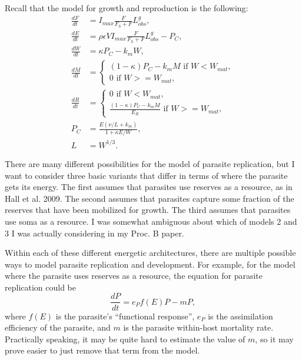 \documentclass[12pt,reqno,final,pdftex]{amsart}\usepackage[]{graphicx}\usepackage[]{color}
\theoremstyle{plain}
\numberwithin{equation}{part}
\begin{document}
Recall that the model for growth and reproduction is the following:
\begin{align}
\frac{dF}{dt} &= I_{max} \frac{F}{F_h+F} L_{obs}^g, \\
\frac{dE}{dt} &= \rho \epsilon V I_{max} \frac{F}{F_h+F} L_{obs}^g - P_C, \\
\frac{dW}{dt} &= \kappa P_C - k_m W, \\
\frac{dM}{dt} &=
\begin{cases}
(1-\kappa) P_C - k_m M \mbox{ if $W < W_{mat}$}, \\
0 \mbox{ if $W >= W_{mat}$},
\end{cases} \\
\frac{dR}{dt} &= \begin{cases} 0 \mbox{ if $W < W_{mat}$}, \\ \frac{(1-\kappa) P_C - k_m M}{E_R} \mbox{ if $W >= W_{mat}$}, \end{cases} \\
P_C &= \frac{E (\nu/L + k_m)}{1 + \kappa E/W}, \\
L &= W^{1/3}.
\end{align}

There are many different possibilities for the model of parasite replication, but I want to consider three basic variants that differ in terms of where the parasite gets its energy.
The first assumes that parasites use reserves as a resource, as in Hall et al. 2009.
The second assumes that parasites capture some fraction of the reserves that have been mobilized for growth.
The third assumes that parasites use soma as a resource.
I was somewhat ambiguous about which of models 2 and 3 I was actually considering in my Proc. B paper.

Within each of these different energetic architectures, there are multiple possible ways to model parasite replication and development.
For example, for the model where the parasite uses reserves as a resource, the equation for parasite replication could be
\begin{equation}
\frac{dP}{dt} = e_P f(E) P - m P,
\end{equation}
where $f(E)$ is the parasite's ``functional response'', $e_P$ is the assimilation efficiency of the parasite, and $m$ is the parasite within-host mortality rate.
Practically speaking, it may be quite hard to estimate the value of $m$, so it may prove easier to just remove that term from the model.
\end{document}
